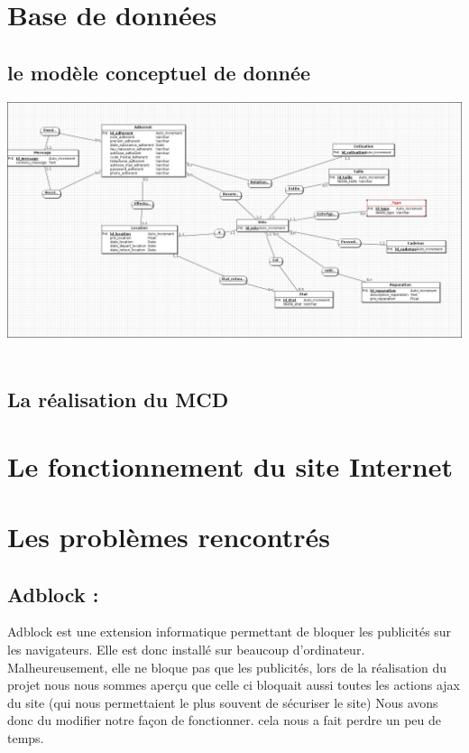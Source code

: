 \documentclass[11pt,a4paper,titlepage]{report}
\begin{document}
\chapter{Base de données}
\section{le modèle conceptuel de donnée}
\begin{center}
\includegraphics[width=1\textwidth]{MCD.jpg}~
\end{center}

\section{La réalisation du MCD}

\chapter{Le fonctionnement du site Internet}


\chapter{Les problèmes rencontrés}

\section{Adblock :} 
Adblock est une extension informatique permettant de bloquer les publicités sur les navigateurs. Elle est donc installé sur beaucoup d'ordinateur. 
Malheureusement, elle ne bloque pas que les publicités, lors de la réalisation du projet nous nous sommes aperçu que celle ci bloquait aussi toutes les actions ajax du site (qui nous permettaient le plus souvent de sécuriser le site) 
Nous avons donc du modifier notre façon de fonctionner. cela nous a fait perdre un peu de temps.
\end{document}
